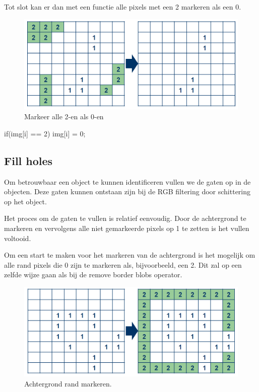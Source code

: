 Tot slot kan er dan met een functie alle pixels met een 2 markeren als een 0.

\begin{figure}
    \begin{center}
        \includegraphics[scale=0.5]{figures/border_blob_step3.png}
    \end{center}
    \caption{Markeer alle 2-en als 0-en}
    \label{fig:bbstep3}
\end{figure}


\begin{cppcode}
if(img[i] == 2){
    img[i] = 0;
}
\end{cppcode}

\subsection{Fill holes}
\label{sub:fillholes}
Om betrouwbaar een object te kunnen identificeren vullen we de gaten op in de
objecten. Deze gaten kunnen ontstaan zijn bij de RGB filtering door schittering
op het object.

Het proces om de gaten te vullen is relatief eenvoudig. Door de achtergrond te
markeren en vervolgens alle niet gemarkeerde pixels op 1 te zetten is het vullen
voltooid.

Om een start te maken voor het markeren van de achtergrond is het mogelijk om
alle rand pixels die 0 zijn te markeren als, bijvoorbeeld, een 2. Dit zal op een
zelfde wijze gaan als bij de remove border blobs operator.

\begin{figure}
    \begin{center}
        \includegraphics[scale=0.5]{figures/fill_holes_step1.png}
    \end{center}
    \caption{Achtergrond rand markeren.}
    \label{fig:fhstep1}
\end{figure}

